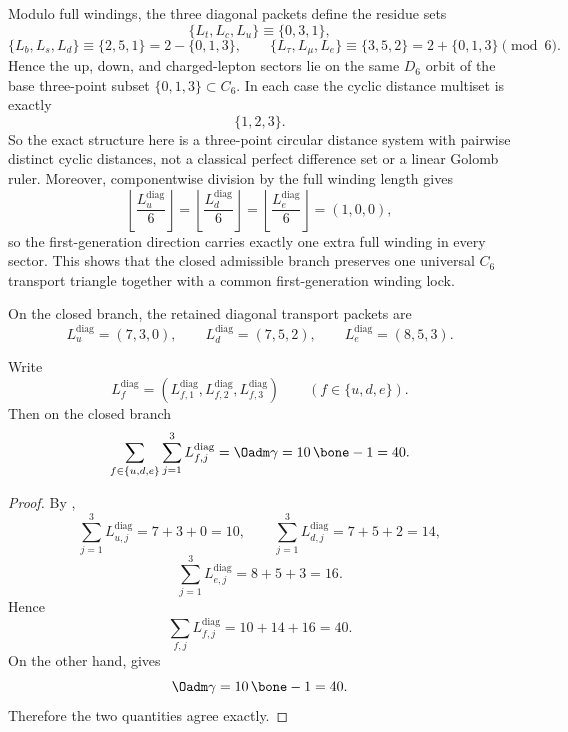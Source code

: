 
\begin{remark}
Modulo full windings, the three diagonal packets define the residue sets
\[
\{L_t,L_c,L_u\}\equiv\{0,3,1\},
\]
\[
\{L_b,L_s,L_d\}\equiv\{2,5,1\}=2-\{0,1,3\},
\qquad
\{L_\tau,L_\mu,L_e\}\equiv\{3,5,2\}=2+\{0,1,3\}
\pmod 6.
\]
Hence the up, down, and charged-lepton sectors lie on the same $D_6$ orbit of the base three-point subset $\{0,1,3\}\subset C_6$. In each case the cyclic distance multiset is exactly
\[
\{1,2,3\}.
\]
So the exact structure here is a three-point circular distance system with pairwise distinct cyclic distances, not a classical perfect difference set or a linear Golomb ruler.
Moreover, componentwise division by the full winding length gives
\[
\left\lfloor\frac{L_u^{\mathrm{diag}}}{6}\right\rfloor
=
\left\lfloor\frac{L_d^{\mathrm{diag}}}{6}\right\rfloor
=
\left\lfloor\frac{L_e^{\mathrm{diag}}}{6}\right\rfloor
=(1,0,0),
\]
so the first-generation direction carries exactly one extra full winding in every sector. This
shows that the closed admissible branch preserves one universal $C_6$ transport triangle together
with a common first-generation winding lock.
\end{remark}

\begin{corollary}
\label{prin:minimal-admissible-transport-packets}
On the closed branch, the retained diagonal transport packets
are
\[
L_u^{\mathrm{diag}}=(7,3,0),
\qquad
L_d^{\mathrm{diag}}=(7,5,2),
\qquad
L_e^{\mathrm{diag}}=(8,5,3).
\]
\end{corollary}

\begin{corollary}
\label{cor:transport-length-sum-rule}
Write
\[
L_f^{\mathrm{diag}}=(L_{f,1}^{\mathrm{diag}},L_{f,2}^{\mathrm{diag}},L_{f,3}^{\mathrm{diag}})
\qquad
(f\in\{u,d,e\}).
\]
Then on the closed branch
\[
\sum_{f\in\{u,d,e\}}\sum_{j=1}^{3}L_{f,j}^{\mathrm{diag}}
=
\Oadm\gamma
=
10\,\bone-1
=
40.
\]
\end{corollary}

\begin{proof}
By ,
\[
\sum_{j=1}^3L_{u,j}^{\mathrm{diag}}=7+3+0=10,
\qquad
\sum_{j=1}^3L_{d,j}^{\mathrm{diag}}=7+5+2=14,
\]
\[
\sum_{j=1}^3L_{e,j}^{\mathrm{diag}}=8+5+3=16.
\]
Hence
\[
\sum_{f,j}L_{f,j}^{\mathrm{diag}}=10+14+16=40.
\]
On the other hand,  gives
\[
\Oadm\gamma=10\,\bone-1=40.
\]
Therefore the two quantities agree exactly.
\end{proof}

